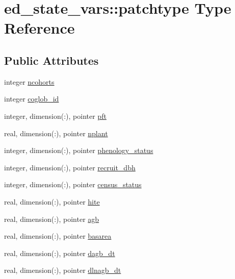 \hypertarget{structed__state__vars_1_1patchtype}{}\section{ed\+\_\+state\+\_\+vars\+:\+:patchtype Type Reference}
\label{structed__state__vars_1_1patchtype}
\subsection*{Public Attributes}
\begin{DoxyCompactItemize}
\item 
integer \hyperlink{structed__state__vars_1_1patchtype_a51030f0f55bb8f4360d8afaf5aea4538}{ncohorts}
\item 
integer \hyperlink{structed__state__vars_1_1patchtype_aa5ca4eed5f3c8cfc04783b235d4b25c7}{coglob\+\_\+id}
\item 
integer, dimension(\+:), pointer \hyperlink{structed__state__vars_1_1patchtype_a0ff01a242b0e1e295f040e39925a9391}{pft}
\item 
real, dimension(\+:), pointer \hyperlink{structed__state__vars_1_1patchtype_a5fad70e77b662c79e2c4276d9de1f568}{nplant}
\item 
integer, dimension(\+:), pointer \hyperlink{structed__state__vars_1_1patchtype_ad26d9c0beab468e975daa53ec443cce1}{phenology\+\_\+status}
\item 
integer, dimension(\+:), pointer \hyperlink{structed__state__vars_1_1patchtype_ae04a7457ad9cba082cfb33c5a8192b94}{recruit\+\_\+dbh}
\item 
integer, dimension(\+:), pointer \hyperlink{structed__state__vars_1_1patchtype_a1964bd21422283e16bc404ac95ff7cb7}{census\+\_\+status}
\item 
real, dimension(\+:), pointer \hyperlink{structed__state__vars_1_1patchtype_adac59e664c355cc5e6ab5bdff7b1b72f}{hite}
\item 
real, dimension(\+:), pointer \hyperlink{structed__state__vars_1_1patchtype_af3f27c5fef0cf39fab0aa923e1482f41}{agb}
\item 
real, dimension(\+:), pointer \hyperlink{structed__state__vars_1_1patchtype_a7d6b4a6fd1c3a73ffdf2f722d49e94ca}{basarea}
\item 
real, dimension(\+:), pointer \hyperlink{structed__state__vars_1_1patchtype_aea917b14ed3927f0a337090a6c599b0a}{dagb\+\_\+dt}
\item 
real, dimension(\+:), pointer \hyperlink{structed__state__vars_1_1patchtype_a6da2e3ee730608d6f28e08ee5083dd97}{dlnagb\+\_\+dt}

\end{DoxyCompactItemize}
